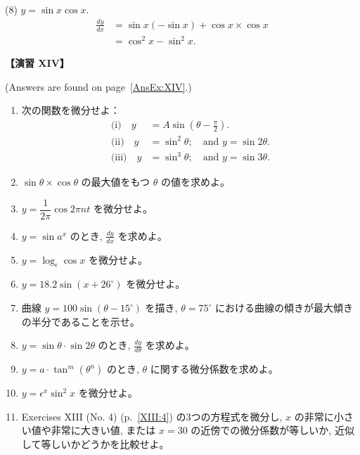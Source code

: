 \documentclass[a4paper,11pt,openany]{ltjsbook}
\newcommand{\Pageref}[2][p.]{#1~\ref{#2}}
\begin{document}
(8) \( y = \sin x \cos x \). 
\begin{align*}
\frac{dy}{dx} 
  &= \sin x(-\sin x) + \cos x \times \cos x \\
  &= \cos^2 x - \sin^2 x.
\end{align*}

\par\textbf{【演習 XIV】}\par (Answers are found on \Pageref[page]{AnsEx:XIV}.)

\begin{enumerate}
\item[(1)] 次の関数を微分せよ：
\begin{align*}
\text{(i)}\quad   y &= A \sin\left(\theta - \frac{\pi}{2}\right).\\
\text{(ii)}\quad  y &= \sin^2 \theta;\quad \text{and } y = \sin 2\theta.\\
\text{(iii)}\quad y &= \sin^3 \theta;\quad \text{and } y = \sin 3\theta.
\end{align*}

\item[(2)] \(\sin\theta \times \cos\theta\) の最大値をもつ \(\theta\) の値を求めよ。

\item[(3)] \(y=\dfrac{1}{2\pi} \cos 2\pi nt\) を微分せよ。

\item[(4)] \(y = \sin a^x\) のとき, \(\frac{dy}{dx}\) を求めよ。

\item[(5)] \(y=\log_\epsilon \cos x\) を微分せよ。

\item[(6)] \(y=18.2 \sin(x+26^\circ)\) を微分せよ。

\item[(7)] 曲線 \(y=100 \sin(\theta-15^\circ)\) を描き, \(\theta = 75^\circ\) における曲線の傾きが最大傾きの半分であることを示せ。

\item[(8)] \(y=\sin \theta·\sin 2\theta\) のとき, \(\frac{dy}{d\theta}\) を求めよ。

\item[(9)] \(y=a·\tan^m(\theta^n)\) のとき, \(\theta\) に関する微分係数を求めよ。

\item[(10)] \(y=\epsilon^x \sin^2 x\) を微分せよ。

\item[(11)] Exercises XIII (No. 4) (\Pageref{XIII:4}) の3つの方程式を微分し, \(x\) の非常に小さい値や非常に大きい値, または \(x=30\) の近傍での微分係数が等しいか, 近似して等しいかどうかを比較せよ。


\end{enumerate}
\end{document}
